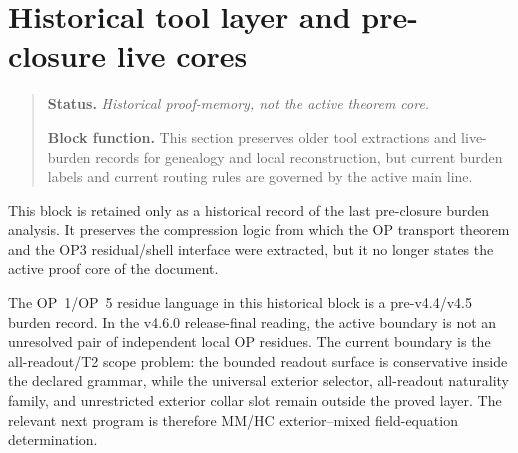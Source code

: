 \section*{Historical tool layer and pre-closure live cores}
\begin{quote}\small
\noindent\textbf{Status.} \emph{Historical proof-memory, not the active theorem core.}\par
\noindent\textbf{Block function.} This section preserves older tool extractions and live-burden records for genealogy and local reconstruction, but current burden labels and current routing rules are governed by the active main line.
\end{quote}
\begin{remark}
This block is retained only as a historical record of the last pre-closure burden analysis. It preserves the compression logic from which the OP transport theorem and the OP3 residual/shell interface were extracted, but it no longer states the active proof core of the document.
\end{remark}

\begin{remark}
The OP~1/OP~5 residue language in this historical block is a pre-v4.4/v4.5 burden record.  In the v4.6.0 release-final reading, the active boundary is not an unresolved pair of independent local OP residues.  The current boundary is the all-readout/T2 scope problem: the bounded readout surface is conservative inside the declared grammar, while the universal exterior selector, all-readout naturality family, and unrestricted exterior collar slot remain outside the proved layer.  The relevant next program is therefore MM/HC exterior--mixed field-equation determination.
\end{remark}

